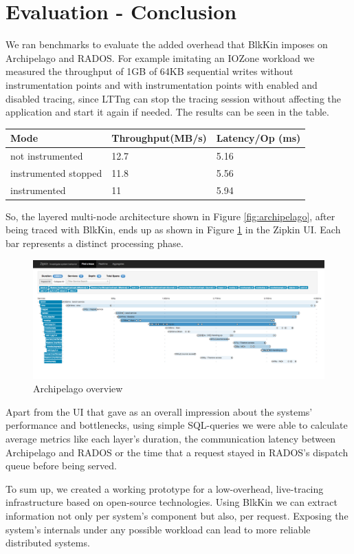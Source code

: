\documentclass[a4paper,10pt,twocolumn]{article}
\begin{document}
\section{Evaluation - Conclusion} 

We ran benchmarks to evaluate the added overhead that BlkKin imposes on
Archipelago and RADOS. For example imitating an IOZone workload we measured the
throughput of 1GB of 64KB sequential writes without instrumentation points and
with instrumentation points with enabled and disabled tracing, since LTTng can
stop the tracing session without affecting the application and start it again if
needed. The results can be seen in the table.

\begin{center}
\begin{tabular}{| l | p{3cm} | p{2cm} |}
    \hline
    Mode & Throughput(MB/s) & Latency/Op (ms)  \\ \hline
    not instrumented & 12.7 & 5.16  \\ \hline
    instrumented stopped & 11.8 &  5.56  \\ \hline
    instrumented & 11 & 5.94  \\ 
    \hline
    \end{tabular}
\end{center}

So, the layered multi-node architecture shown in Figure \ref{fig:archipelago},
after being traced with BlkKin, ends up as shown in Figure \ref{fig:zipkin} in
the Zipkin UI. Each bar represents a distinct processing phase.

\begin{figure}[h!]
  \centering
  \includegraphics[scale=0.15]{images/zipkin.png}
  \caption{Archipelago overview}
  \label{fig:zipkin}
\end{figure}

Apart from the UI that gave as an overall impression about the systems'
performance and bottlenecks, using simple SQL-queries we were able to calculate
average metrics like each layer's duration, the communication latency between
Archipelago and RADOS or the time that a request stayed in RADOS's dispatch
queue before being served.   

To sum up, we created a working prototype for a low-overhead, live-tracing
infrastructure based on open-source technologies. Using BlkKin we can extract
information not only per system's component but also, per request. Exposing the
system's internals under any possible workload can lead to more reliable
distributed systems.



\end{document}
